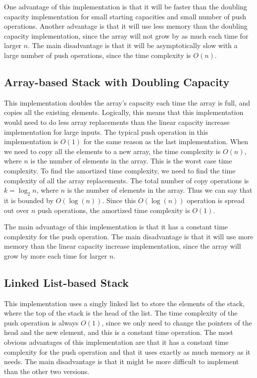 \documentclass{article}
\begin{document}
One advantage of this implementation is that it will be faster than the doubling capacity implementation for small starting capacities and small number of push operations. 
Another advantage is that it will use less memory than the doubling capacity implementation, since the array will not grow by as much each time for larger $n$.
The main disadvantage is that it will be asymptotically slow with a large number of push operations, since the time complexity is $O(n)$.

\subsection{Array-based Stack with Doubling Capacity}
This implementation doubles the array's capacity each time the array is full, and copies all the existing elements. 
Logically, this means that this implementation would need to do less array replacements than the linear capacity increase implementation for large inputs. 
The typical push operation in this implementation is $O(1)$ for the same reason as the last implementation.
When we need to copy all the elements to a new array, the time complexity is $O(n)$, where $n$ is the number of elements in the array. 
This is the worst case time complexity.
To find the amortized time complexity, we need to find the time complexity of all the array replacements.
The total number of copy operations is $k = \log_2 n$, where $n$ is the number of elements in the array.
Thus we can say that it is bounded by $O(\log(n))$.
Since this $O(\log(n))$ operation is spread out over $n$ push operations, the amortized time complexity is $O(1)$.

The main advantage of this implementation is that it has a constant time complexity for the push operation.
The main disadvantage is that it will use more memory than the linear capacity increase implementation, since the array will grow by more each time for larger $n$.

\subsection{Linked List-based Stack}
This implementation uses a singly linked list to store the elements of the stack, where the top of the stack is the head of the list.
The time complexity of the push operation is always $O(1)$, since we only need to change the pointers of the head and the new element, and this is a constant time operation.
The most obvious advantages of this implementation are that it has a constant time complexity for the push operation and that it uses exactly as much memory as it needs. 
The main disadvantage is that it might be more difficult to implement than the other two versions.
\end{document}
